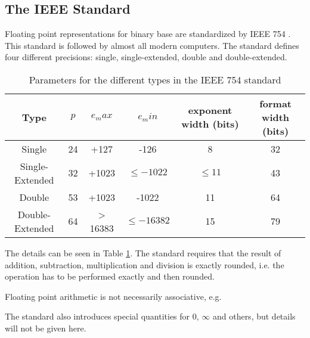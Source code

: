 \subsection{The IEEE Standard}
	Floating point representations for binary base are standardized by IEEE 754 \cite{ieee}. 
	This standard is followed by almost all modern computers.
	The standard defines four different precisions: single, single-extended, double and double-extended.
	  \begin{table}
	  	\centering
	    \begin{tabular}{ | c || c | c | c | c | c | }
	    \hline
	    Type & $p$ & $e_max$ & $e_min$ & exponent width (bits) & format width (bits) \\ \hline \hline
	    Single & 24 & +127 & -126 & 8 & 32 \\ \hline
	    Single-Extended & 32 & +1023 & $\leq -1022$ & $\leq 11$ & 43 \\ \hline
	    Double & 53 & +1023 & -1022 & 11 & 64 \\ \hline
	    Double-Extended & 64 & > 16383 & $\leq -16382$ & 15 & 79 \\ \hline
	    \end{tabular}
	    \caption{Parameters for the different types in the IEEE 754 standard}\label{table:IEEE floating point}
	  \end{table}
	  
	The details can be seen in Table \ref{table:IEEE floating point}.
	The standard requires that the result of addition, subtraction, multiplication and division is exactly rounded, 
	i.e. the operation has to be performed exactly and then rounded.

	Floating point arithmetic is not necessarily associative, e.g.

	The standard also introduces special quantities for $0$, $\infty$ and others, but details will
	not be given here.

	


